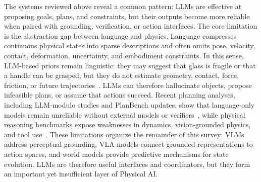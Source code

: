 The systems reviewed above reveal a common pattern: LLMs are effective at proposing goals, plans, and constraints, but their outputs become more reliable when paired with grounding, verification, or action interfaces. 
The core limitation is the abstraction gap between language and physics. 
Language compresses continuous physical states into sparse descriptions and often omits pose, velocity, contact, deformation, uncertainty, and embodiment constraints. 
In this sense, LLM-based priors remain linguistic: they may suggest that glass is fragile or that a handle can be grasped, but they do not estimate geometry, contact, force, friction, or future trajectories~\citep{qiu2025phybench,xu2025physense}. 
LLMs can therefore hallucinate objects, propose infeasible plans, or assume that actions succeed. 
Recent planning analyses, including LLM-modulo studies and PlanBench updates, show that language-only models remain unreliable without external models or verifiers~\citep{kambhampati2024llmscantplan,valmeekam2024planbench}, while physical reasoning benchmarks expose weaknesses in dynamics, vision-grounded physics, and tool use~\citep{xiang2025seephys,zhang2025phystoolbench}. 
These limitations organize the remainder of this survey: VLMs address perceptual grounding, VLA models connect grounded representations to action spaces, and world models provide predictive mechanisms for state evolution. 
LLMs are therefore useful interfaces and coordinators, but they form an important yet insufficient layer of Physical AI.
